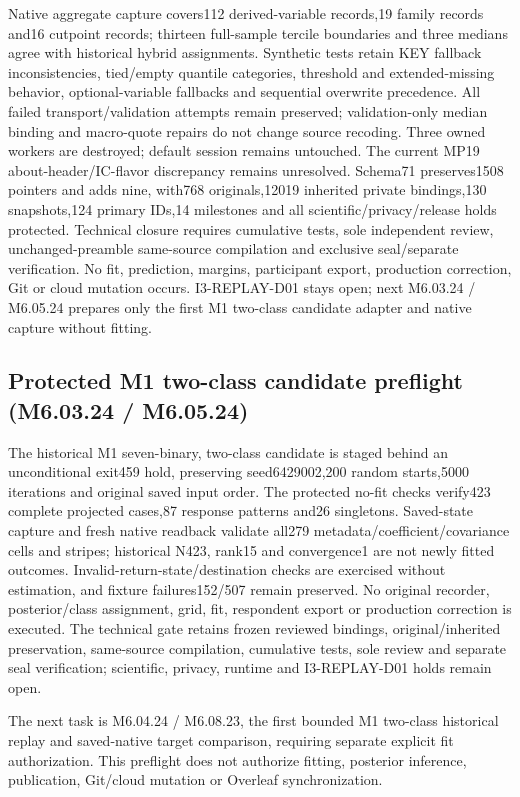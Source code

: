 \documentclass[11pt,a4paper]{article}
\begin{document}
Native aggregate capture covers112 derived-variable records,19 family records and16 cutpoint records; thirteen full-sample tercile boundaries and three medians agree with historical hybrid assignments. Synthetic tests retain KEY fallback inconsistencies, tied/empty quantile categories, threshold and extended-missing behavior, optional-variable fallbacks and sequential overwrite precedence. All failed transport/validation attempts remain preserved; validation-only median binding and macro-quote repairs do not change source recoding. Three owned workers are destroyed; default session remains untouched. The current MP19 about-header/IC-flavor discrepancy remains unresolved. Schema71 preserves1508 pointers and adds nine, with768 originals,12019 inherited private bindings,130 snapshots,124 primary IDs,14 milestones and all scientific/privacy/release holds protected. Technical closure requires cumulative tests, sole independent review, unchanged-preamble same-source compilation and exclusive seal/separate verification. No fit, prediction, margins, participant export, production correction, Git or cloud mutation occurs. I3-REPLAY-D01 stays open; next M6.03.24 / M6.05.24 prepares only the first M1 two-class candidate adapter and native capture without fitting.
\subsection*{Protected M1 two-class candidate preflight (M6.03.24 / M6.05.24)}
The historical M1 seven-binary, two-class candidate is staged behind an unconditional exit459 hold, preserving seed6429002,200 random starts,5000 iterations and original saved input order. The protected no-fit checks verify423 complete projected cases,87 response patterns and26 singletons. Saved-state capture and fresh native readback validate all279 metadata/coefficient/covariance cells and stripes; historical N423, rank15 and convergence1 are not newly fitted outcomes. Invalid-return-state/destination checks are exercised without estimation, and fixture failures152/507 remain preserved. No original recorder, posterior/class assignment, grid, fit, respondent export or production correction is executed. The technical gate retains frozen reviewed bindings, original/inherited preservation, same-source compilation, cumulative tests, sole review and separate seal verification; scientific, privacy, runtime and I3-REPLAY-D01 holds remain open.

The next task is M6.04.24 / M6.08.23, the first bounded M1 two-class historical replay and saved-native target comparison, requiring separate explicit fit authorization. This preflight does not authorize fitting, posterior inference, publication, Git/cloud mutation or Overleaf synchronization.
\end{document}
